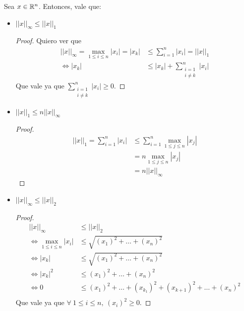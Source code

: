 \begin{propi} Sea $x \in \mathbb{R}^{n}$. Entonces, vale que:
    \begin{itemize}
        \item $||x||_{\infty} \leq ||x||_1$
            \begin{proof} Quiero ver que
                \begin{align*}
                    ||x||_{\infty} = \max\limits_{1 \leq i \leq n}|x_i|
                    = |x_k| &\leq \sum_{i = 1}^{n} |x_i| = ||x||_1\\
                    \iff |x_k| &\leq |x_k| + \sum_{\substack{i = 1\\ i \neq k}}^{n} |x_i|
                \end{align*}
                Que vale ya que $\sum\limits_{\substack{i = 1\\ i \neq k}}^{n} |x_i| \geq 0$.
            \end{proof}
        \item $||x||_1 \leq n||x||_{\infty}$
            \begin{proof}
                \begin{align*}
                    ||x||_1 = \sum_{i = 1}^{n} |x_i|
                    &\leq \sum_{i = 1}^{n} \max\limits_{1 \leq j \leq n}|x_j| \\
                    &= n\max\limits_{1 \leq j \leq n}|x_j| \\
                    &= n||x||_{\infty}
                \end{align*}
            \end{proof}
        \item $||x||_{\infty} \leq ||x||_2$
            \begin{proof}
                \begin{align*}
                    ||x||_{\infty} &\leq ||x||_2 \\
                    \iff \max\limits_{1 \leq i \leq n}|x_i| &\leq \sqrt{(x_1)^2 + \dots + (x_n)^2} \\
                    \iff |x_k| &\leq \sqrt{(x_1)^2 + \dots + (x_n)^2} \\
                    \iff |x_k|^2 &\leq (x_1)^2 + \dots + (x_n)^2 \\
                    \iff 0 &\leq (x_1)^2 + \dots + (x_{k_1})^2 + (x_{k+1})^2 + \dots + (x_n)^2 \\
                \end{align*}
                Que vale ya que $\forall\ 1 \leq i \leq n,\ (x_i)^2 \geq 0$.
            \end{proof}
    \end{itemize}
\end{propi}

